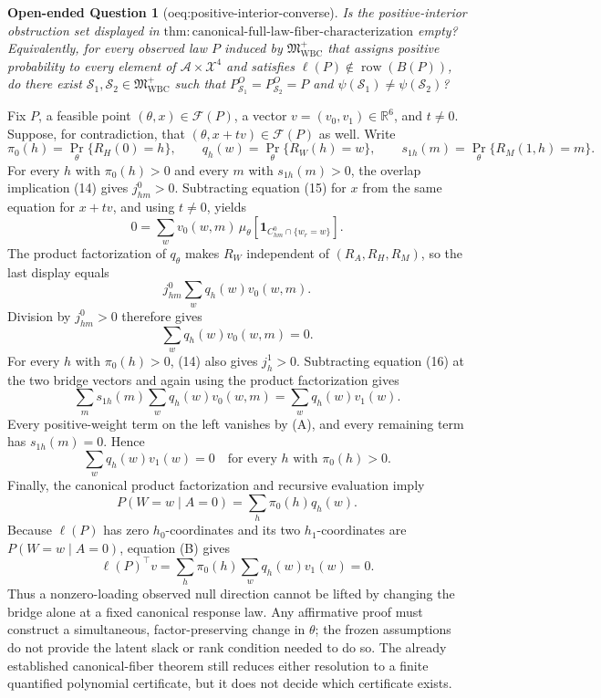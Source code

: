 \documentclass{article}
\newtheorem{openendedquestion}{Open-ended Question}
\begin{document}
\begin{openendedquestion}[oeq:positive-interior-converse]\label{oeq:positive-interior-converse}
Is the positive-interior obstruction set displayed in \(\mathrm{thm{:}canonical\text{-}full\text{-}law\text{-}fiber\text{-}characterization}\) empty?  Equivalently, for every observed law \(P\) induced by \(\mathfrak M_{\mathrm{WBC}}^{+}\) that assigns positive probability to every element of \(\mathcal A\times\mathcal X^4\) and satisfies \(\ell(P)\notin\operatorname{row}(B(P))\), do there exist \(\mathcal S_1,\mathcal S_2\in\mathfrak M_{\mathrm{WBC}}^{+}\) such that \(P_{\mathcal S_1}^O=P_{\mathcal S_2}^O=P\) and \(\psi(\mathcal S_1)\ne\psi(\mathcal S_2)\)?
\end{openendedquestion}
Fix \(P\), a feasible point \((\theta,x)\in\mathcal F(P)\), a vector \(v=(v_0,v_1)\in\mathbb R^6\), and \(t\ne0\). Suppose, for contradiction, that \((\theta,x+t v)\in\mathcal F(P)\) as well. Write
\[
 \pi_0(h)=\Pr_\theta\{R_H(0)=h\},\qquad
 q_h(w)=\Pr_\theta\{R_W(h)=w\},\qquad
 s_{1h}(m)=\Pr_\theta\{R_M(1,h)=m\}.
\]
For every \(h\) with \(\pi_0(h)>0\) and every \(m\) with \(s_{1h}(m)>0\), the overlap implication (14) gives \(j^0_{hm}>0\). Subtracting equation (15) for \(x\) from the same equation for \(x+t v\), and using \(t\ne0\), yields
\[
 0=\sum_w v_0(w,m)\,
 \mu_\theta[\mathbf 1_{C^0_{hm}\cap\{w_r=w\}}].
\]
The product factorization of \(q_\theta\) makes \(R_W\) independent of \((R_A,R_H,R_M)\), so the last display equals
\[
 j^0_{hm}\sum_w q_h(w)v_0(w,m).
\]
Division by \(j^0_{hm}>0\) therefore gives
\[
 \sum_wq_h(w)v_0(w,m)=0.
 \tag{A}
\]
For every \(h\) with \(\pi_0(h)>0\), (14) also gives \(j^1_h>0\). Subtracting equation (16) at the two bridge vectors and again using the product factorization gives
\[
 \sum_m s_{1h}(m)\sum_wq_h(w)v_0(w,m)
 =\sum_wq_h(w)v_1(w).
\]
Every positive-weight term on the left vanishes by (A), and every remaining term has \(s_{1h}(m)=0\). Hence
\[
 \sum_wq_h(w)v_1(w)=0
 \quad\text{for every }h\text{ with }\pi_0(h)>0.
 \tag{B}
\]
Finally, the canonical product factorization and recursive evaluation imply
\[
 P(W=w\mid A=0)=\sum_h\pi_0(h)q_h(w).
\]
Because \(\ell(P)\) has zero \(h_0\)-coordinates and its two \(h_1\)-coordinates are \(P(W=w\mid A=0)\), equation (B) gives
\[
 \ell(P)^{\top}v
 =\sum_h\pi_0(h)\sum_wq_h(w)v_1(w)=0.
\]
Thus a nonzero-loading observed null direction cannot be lifted by changing the bridge alone at a fixed canonical response law. Any affirmative proof must construct a simultaneous, factor-preserving change in \(\theta\); the frozen assumptions do not provide the latent slack or rank condition needed to do so. The already established canonical-fiber theorem still reduces either resolution to a finite quantified polynomial certificate, but it does not decide which certificate exists.
\end{document}
